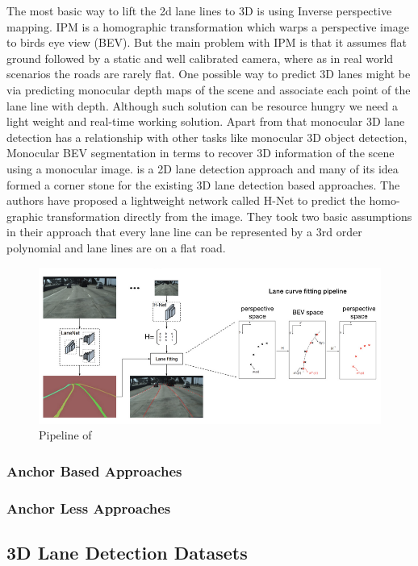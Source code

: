 The most basic way to lift the 2d lane lines to 3D is using Inverse perspective mapping. IPM is a homographic transformation which warps a perspective image to birds eye view (BEV). But the main problem with IPM is that it assumes flat ground followed by a static and well calibrated camera, where as in real world scenarios the roads are rarely flat. One possible way to predict 3D lanes might be via predicting monocular depth maps of the scene and associate each point of the lane line with depth. Although such solution can be resource hungry we need a light weight and real-time working solution. Apart from that monocular 3D lane detection has a relationship with other tasks like monocular 3D object detection, Monocular BEV segmentation in terms to recover 3D information of the scene using a monocular image.
\cite{DBLP:journals/corr/abs-1802-05591} is a 2D lane detection approach and many of its idea formed a corner stone for the existing 3D lane detection based approaches. The authors have proposed a lightweight network called H-Net to predict the homo-graphic transformation directly from the image. They took two basic assumptions in their approach that every lane line can be represented by a 3rd order polynomial and lane lines are on a flat road. 

        
 \begin{figure}[h]
    \centering
    \includegraphics[width=\textwidth]{images/lanenet.png}
    \caption{Pipeline of \cite{DBLP:journals/corr/abs-1802-05591}}
    \end{figure}


\subsubsection{Anchor Based Approaches}
\subsubsection{Anchor Less Approaches}
\subsection{3D Lane Detection Datasets}

